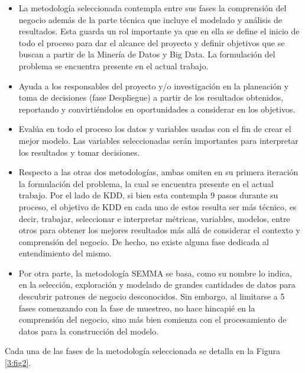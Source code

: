 \begin{itemize}
	\item La metodología seleccionada contempla entre sus fases la comprensión del negocio además de la parte técnica que incluye el modelado y análisis de resultados. Esta guarda un rol importante ya que en ella se define el inicio de todo el proceso para dar el alcance del proyecto y definir objetivos que se buscan a partir de la Minería de Datos y Big Data. La formulación del problema se encuentra presente en el actual trabajo.
	\item Ayuda a los responsables del proyecto y/o investigación en la planeación y toma de decisiones (fase Despliegue) a partir de los resultados obtenidos, reportando y convirtiéndolos en oportunidades a considerar en los objetivos.
	\item Evalúa en todo el proceso los datos y variables usadas con el fin de crear el mejor modelo. Las variables seleccionadas serán importantes para interpretar los resultados y tomar decisiones.
	\item Respecto a las otras dos metodologías, ambas omiten en su primera iteración la formulación del problema, la cual se encuentra presente en el actual trabajo. Por el lado de KDD, si bien esta contempla 9 pasos durante su proceso, el objetivo de KDD en cada uno de estos resulta ser más técnico, es decir, trabajar, seleccionar e interpretar métricas, variables, modelos, entre otros para obtener los mejores resultados más allá de considerar el contexto y comprensión del negocio. De hecho, no existe alguna fase dedicada al entendimiento del mismo.
	\item Por otra parte, la metodología SEMMA se basa, como su nombre lo indica, en la selección, exploración y modelado de grandes cantidades de datos para descubrir patrones de negocio desconocidos. Sin embargo, al limitarse a 5 fases comenzando con la fase de muestreo, no hace hincapié en la comprensión del negocio, sino más bien comienza con el procesamiento de datos para la construcción del modelo.
\end{itemize}

Cada una de las fases de la metodología seleccionada se detalla en la Figura \ref{3:fig2}.

